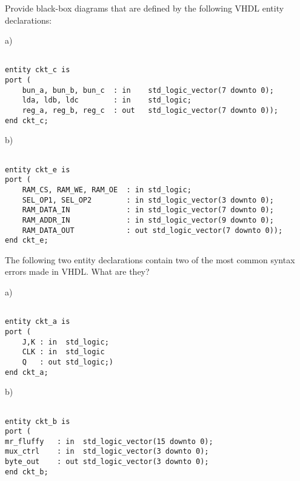 \begin{my_num_list}
\item Provide black-box diagrams that are defined by the following VHDL entity declarations:

\noindent
\begin{minipage}{1\linewidth}
a)
\begin{lstlisting}[]

entity ckt_c is
port (
    bun_a, bun_b, bun_c  : in    std_logic_vector(7 downto 0);
    lda, ldb, ldc        : in    std_logic;
    reg_a, reg_b, reg_c  : out   std_logic_vector(7 downto 0));
end ckt_c;
\end{lstlisting}
\end{minipage}

\noindent
\begin{minipage}{1\linewidth}
b)
\begin{lstlisting}[]

entity ckt_e is
port (
    RAM_CS, RAM_WE, RAM_OE  : in std_logic;
    SEL_OP1, SEL_OP2        : in std_logic_vector(3 downto 0);
    RAM_DATA_IN             : in std_logic_vector(7 downto 0);
    RAM_ADDR_IN             : in std_logic_vector(9 downto 0);
    RAM_DATA_OUT            : out std_logic_vector(7 downto 0));
end ckt_e;
\end{lstlisting}
\end{minipage}

\item The following two entity declarations contain two of the most common syntax errors made in VHDL. What are they?

\noindent
\begin{minipage}{1\linewidth}
a)
\begin{lstlisting}[framexrightmargin=-180pt]

entity ckt_a is
port (
    J,K : in  std_logic;
    CLK : in  std_logic
    Q   : out std_logic;)
end ckt_a;
\end{lstlisting}
\end{minipage}

\noindent
\begin{minipage}{1\linewidth}
b)
\begin{lstlisting}[framexrightmargin=-80pt, mathescape=true]

entity ckt_b is
port (
mr_fluffy   : in  std_logic_vector(15 downto 0);
mux_ctrl    : in  std_logic_vector(3 downto 0);
byte_out    : out std_logic_vector(3 downto 0);
end ckt_b;
\end{lstlisting}
\end{minipage}
\end{my_num_list}


